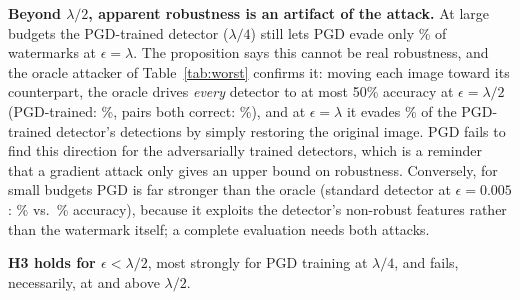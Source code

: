 \documentclass[sigconf, nonacm]{acmart}
\newcommand{\todo}[1]{\textcolor{red}{[TODO: #1]}}
\begin{document}
\textbf{Beyond $\lambda/2$, apparent robustness is an artifact of the attack.} At large budgets the
PGD-trained detector ($\lambda/4$) still lets PGD evade only \PatAPgdAsrD\% of watermarks at
$\epsilon=\lambda$. The proposition says this cannot be real robustness, and the oracle attacker of
Table~\ref{tab:worst} confirms it: moving each image toward its counterpart, the oracle drives
\emph{every} detector to at most 50\% accuracy at $\epsilon=\lambda/2$ (PGD-trained: \PatAOracleAccC\%,
pairs both correct: \PatAOraclePairC\%), and at $\epsilon=\lambda$ it evades \PatAOracleAsrD\% of the
PGD-trained detector's detections by simply restoring the original image. PGD fails to find this
direction for the adversarially trained detectors, which is a reminder that a gradient attack only
gives an upper bound on robustness. Conversely, for small budgets PGD is far stronger than the
oracle (standard detector at $\epsilon=0.005$: \BasePgdAccB\% vs.\ \BaseOracleAccB\% accuracy),
because it exploits the detector's non-robust features rather than the watermark itself; a complete
evaluation needs both attacks.

\textbf{H3 holds for $\epsilon<\lambda/2$}, most strongly for PGD training at $\lambda/4$, and
fails, necessarily, at and above $\lambda/2$.

\begin{table}[t]
\caption{Accuracy (\%) under PGD and under the oracle attacker (Orc.), $\lambda=0.02$. At
$\epsilon=\lambda/2=0.01$ the oracle caps every detector at 50\%.}\label{tab:worst}
\small
\resizebox{\columnwidth}{!}{\IfFileExists{generated/table_worst.tex}{}{\todo{table}}}
\end{table}
\end{document}
